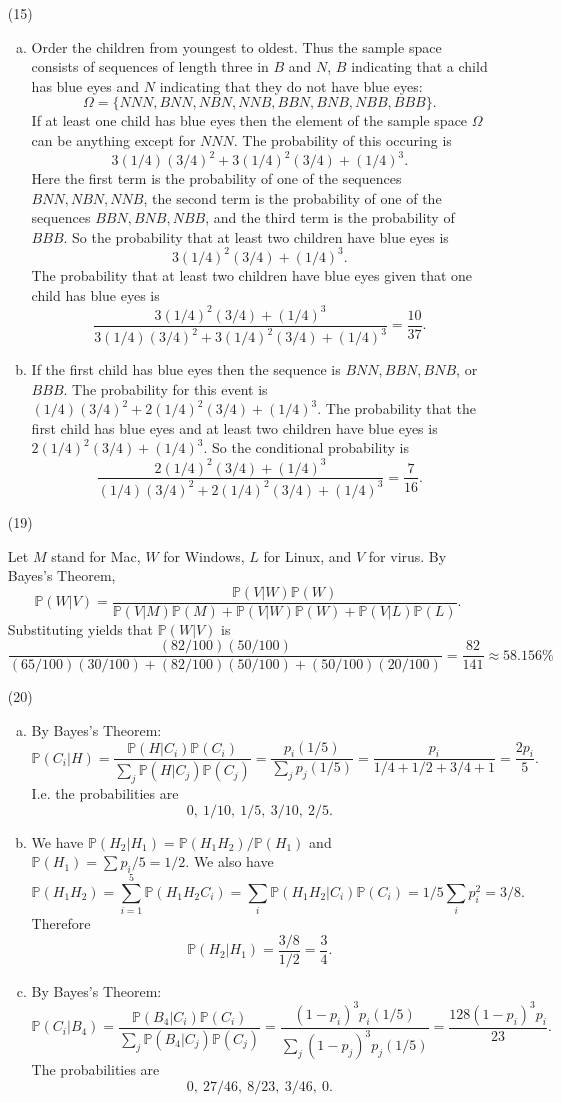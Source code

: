 \documentclass[10pt]{article}
\renewcommand{\P}{\mathbb{P}}
\begin{document}
\begin{enumerate}
\item[(15)]

\begin{enumerate}[(a)]
\item Order the children from youngest to oldest. Thus the sample space
consists of sequences of length three in $B$ and $N$, $B$ indicating
that a child has blue eyes and $N$ indicating that they do not have blue
eyes:
\[
\Omega = \{NNN, BNN, NBN, NNB, BBN, BNB, NBB, BBB\}.
\]
If at least one child has blue eyes then the element of the sample space
$\Omega$ can be anything except for $NNN$. The probability of this occuring
is \[
3(1/4)(3/4)^2 + 3(1/4)^2(3/4) + (1/4)^3.
\]
Here the first term is the probability of one of the sequences $BNN,NBN,NNB$,
the second term is the probability of one of the sequences $BBN, BNB, NBB$,
and the third term is the probability of $BBB$. So the probability that
at least two children have blue eyes is
\[3(1/4)^2(3/4) + (1/4)^3.\]
The probability that at least two children have blue eyes given that one child
has blue eyes is
\[
\frac{3(1/4)^2(3/4) + (1/4)^3}{3(1/4)(3/4)^2 + 3(1/4)^2(3/4) + (1/4)^3}
=\frac{10}{37}.
\]
\item If the first child has blue eyes then the sequence is
$BNN, BBN, BNB$, or $BBB$. The probability for this event is
$(1/4)(3/4)^2 + 2(1/4)^2(3/4) + (1/4)^3$. The probability that the first child
has blue eyes and at least two children have blue eyes is
$2(1/4)^2(3/4) + (1/4)^3$. So the conditional probability is
\[
\frac{2(1/4)^2(3/4) + (1/4)^3}{(1/4)(3/4)^2 + 2(1/4)^2(3/4) + (1/4)^3}
=\frac{7}{16}.
\]
\end{enumerate}

\item[(19)]

Let $M$ stand for Mac, $W$ for Windows, $L$ for Linux, and $V$ for virus.
By Bayes's Theorem,
\[
\P(W|V) = \frac{\P(V|W)\P(W)}{\P(V|M)\P(M) +\P(V|W)\P(W) + \P(V|L)\P(L)}.
\]
Substituting yields that $\P(W|V)$ is
\[
\frac{(82/100)(50/100)}{(65/100)(30/100)+(82/100)(50/100)+(50/100)(20/100)}
= \frac{82}{141} \approx 58.156 \%
\]

\item[(20)]

\begin{enumerate}[(a)]
\item By Bayes's Theorem:
\[
\P(C_i | H) = \frac{\P(H|C_i)\P(C_i)}{\sum_j \P(H | C_j)\P(C_j)}=
\frac{p_i(1/5)}{\sum_j p_j(1/5)}=\frac{p_i}{1/4+1/2+3/4+1} = \frac{2p_i}{5}.
\]
I.e. the probabilities are
\[
0, \ 1/10, \ 1/5, \ 3/10, \ 2/5.
\]
\item We have $\P(H_2|H_1)=\P(H_1H_2)/\P(H_1)$ and $\P(H_1)=\sum p_i/5 =1/2$.
We also have
\[
\P(H_1H_2) = \sum_{i=1}^5 \P(H_1H_2C_i) = \sum_i \P(H_1H_2|C_i)\P(C_i)
=1/5 \sum_i p_i^2 =3/8.
\]
Therefore
\[
\P(H_2|H_1) = \frac{3/8}{1/2} = \frac{3}{4}.
\]
\item By Bayes's Theorem:
\[
\P(C_i|B_4)= \frac{\P(B_4|C_i)\P(C_i)}{\sum_j \P(B_4|C_j)\P(C_j)}
=\frac{(1-p_i)^3p_i(1/5)}{\sum_j(1-p_j)^3p_j(1/5)} =
\frac{128(1-p_i)^3p_i}{23}.
\]
The probabilities are
\[
0, \ 27/46, \ 8/23, \ 3/46, \ 0.
\]
\end{enumerate}


\end{enumerate}
\end{document}
